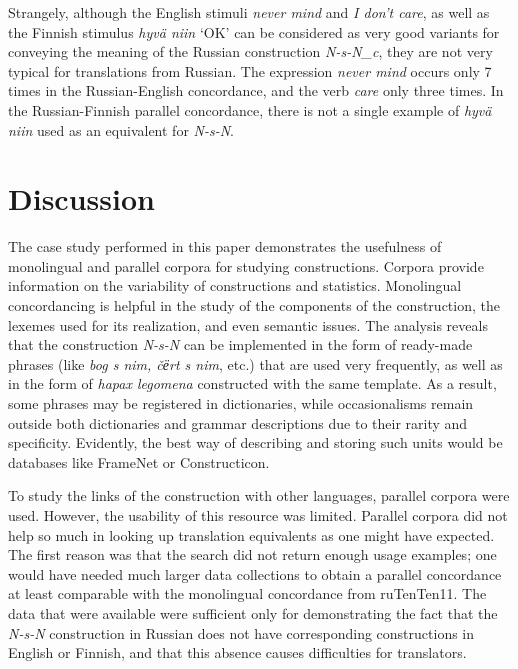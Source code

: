 \documentclass[output=paper]{langscibook}
\begin{document}
\glt 
\z

Strangely, although the English stimuli \textit{never mind} and \textit{I don’t care}, as well as the Finnish stimulus \textit{hyvä niin} ‘OK’ can be considered as very good variants for conveying the meaning of the Russian construction \textit{N-s-N\_c}, they are not very typical for translations from Russian. The expression \textit{never mind} occurs only 7 times in the Russian-English concordance, and the verb \textit{care} only three times. In the Russian-Finnish parallel concordance, there is not a single example of \textit{hyvä niin} used as an equivalent for \textit{N-s-N}.

\section{Discussion}

The case study performed in this paper demonstrates the usefulness of monolingual and parallel corpora for studying constructions. Corpora provide information on the variability of constructions and statistics. Monolingual concordancing is helpful in the study of the components of the construction, the lexemes used for its realization, and even semantic issues. The analysis reveals that the construction \textit{N-s-N} can be implemented in the form of ready-made phrases (like \textit{bog s nim, č{ё}rt s nim}, etc.) that are used very frequently, as well as in the form of \textit{hapax legomena} constructed with the same template. As a result, some phrases may be registered in dictionaries, while occasionalisms remain outside both dictionaries and grammar descriptions due to their rarity and specificity. Evidently, the best way of describing and storing such units would be databases like FrameNet or Constructicon.

To study the links of the construction with other languages, parallel corpora were used. However, the usability of this resource was limited. Parallel corpora did not help so much in looking up translation equivalents as one might have expected. The first reason was that the search did not return enough usage examples; one would have needed much larger data collections to obtain a parallel concordance at least comparable with the monolingual concordance from ruTenTen11. The data that were available were sufficient only for demonstrating the fact that the \textit{N-s-N} construction in Russian does not have corresponding constructions in English or Finnish, and that this absence causes difficulties for translators.
\end{document}
